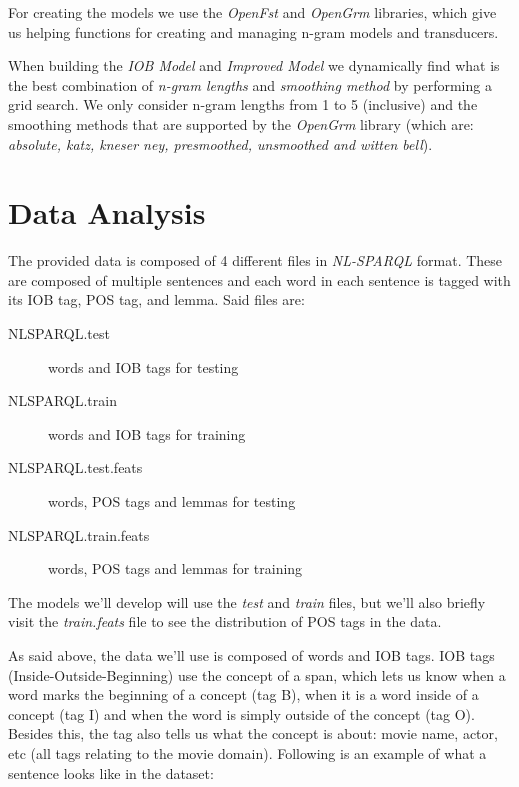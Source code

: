\documentclass[11pt,a4paper]{article}
\begin{document}
	For creating the models we use the \textit{OpenFst} \cite{openfst} and \textit{OpenGrm} \cite{opengrm} libraries, which give us helping functions for creating and managing n-gram models and transducers.

	When building the \textit{IOB Model} and \textit{Improved Model} we dynamically find what is the best combination of \textit{n-gram lengths} and \textit{smoothing method} by performing a grid search. We only consider n-gram lengths from 1 to 5 (inclusive) and the smoothing methods that are supported by the \textit{OpenGrm} library (which are: \textit{absolute, katz, kneser ney, presmoothed, unsmoothed and witten bell}).
	
\section{Data Analysis}
\label{sec-data-analysis}

	The provided data is composed of 4 different files in \textit{NL-SPARQL} format. These are composed of multiple sentences and each word in each sentence is tagged with its IOB tag, POS tag, and lemma. Said files are:
	
	\begin{description}
		\item[NLSPARQL.test] words and IOB tags for testing
		\item[NLSPARQL.train] words and IOB tags for training              
		\item[NLSPARQL.test.feats] words, POS tags and lemmas for testing
		\item[NLSPARQL.train.feats] words, POS tags and lemmas for training
	\end{description}

	The models we'll develop will use the \textit{test} and \textit{train} files, but we'll also briefly visit the \textit{train.feats} file to see the distribution of POS tags in the data.
	
	As said above, the data we'll use is composed of words and IOB tags. IOB tags (Inside-Outside-Beginning) use the concept of a span, which lets us know when a word marks the beginning of a concept (tag B), when it is a word inside of a concept (tag I) and when the word is simply outside of the concept (tag O). Besides this, the tag also tells us what the concept is about: movie name, actor, etc (all tags relating to the movie domain). Following is an example of what a sentence looks like in the dataset:
	
\end{document}
